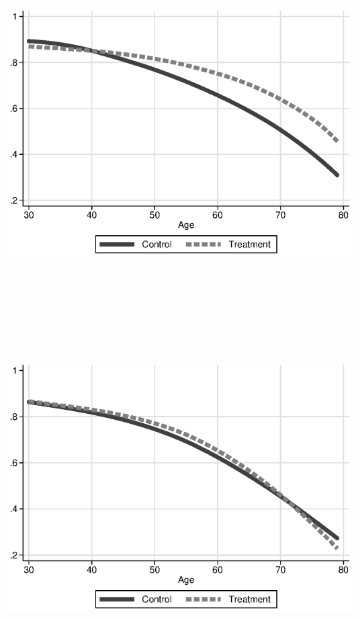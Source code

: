 \begin{figure}[H]
    \centering
\caption{Predicted Quality-Adjusted Life Years} \label{figure:qaly}
\begin{subfigure}{.8\textwidth}
  \centering
  \includegraphics[height=3.5in]{AppOutput/Health/ABC-FAM_qaly_surv_summary_male}
\end{subfigure}

\begin{subfigure}{.8\textwidth} %
  \centering
  \includegraphics[height=3.5in]{AppOutput/Health/ABC-FAM_qaly_surv_summary_female}
\end{subfigure}
\end{figure}
